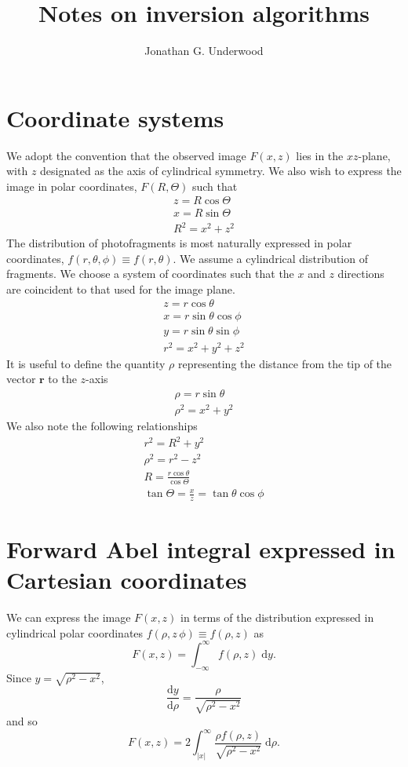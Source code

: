 \documentclass{article}
\title{Notes on inversion algorithms}
\author {Jonathan G. Underwood}
\begin{document}
\maketitle
\tableofcontents

\section{Coordinate systems}
We adopt the convention that the observed image $F(x,z)$ lies in the
$xz$-plane, with $z$ designated as the axis of cylindrical symmetry. We also
wish to express the image in polar coordinates, $F(R, \Theta)$ such that
\begin{gather}
  z=R\cos\Theta\\
  x=R\sin\Theta\\
  R^2=x^2+z^2
\end{gather}
The distribution of photofragments is most naturally expressed in polar
coordinates, $f(r, \theta, \phi)\equiv f(r, \theta)$. We assume a cylindrical
distribution of fragments. We choose a system of coordinates such that the $x$
and $z$ directions are coincident to that used for the image plane.
\begin{gather}
  z=r\cos\theta\\
  x=r\sin\theta\cos\phi\\
  y=r\sin\theta\sin\phi\\
  r^2=x^2+y^2+z^2
\end{gather}
It is useful to define the quantity $\rho$ representing the distance from the
tip of the vector $\mathbf{r}$ to the $z$-axis
\begin{gather}
  \rho=r\sin\theta\\
  \rho^2=x^2+y^2
\end{gather}
We also note the following relationships
\begin{gather}
  r^2=R^2+y^2\\
  \rho^2=r^2-z^2\\
  R=\frac{r\cos\theta}{\cos\Theta}\\
  \tan\Theta=\frac{x}{z}=\tan\theta\cos\phi
\end{gather}

\section{Forward Abel integral expressed in Cartesian coordinates}
We can express the image $F(x,z)$ in terms of the distribution expressed in
cylindrical polar coordinates $f(\rho,z\, \phi)\equiv f(\rho, z)$ as 
\begin{equation}
  F(x,z)=\int_{-\infty}^{\infty}
  f(\rho, z)\;\mathrm{d}y.
\end{equation}
Since $y=\sqrt{\rho^2-x^2}$,
\begin{equation}
  \frac{\mathrm{d}y}{\mathrm{d}\rho}
  =\frac{\rho}{\sqrt{\rho^2-x^2}}
\end{equation}
and so
\begin{equation}
  \label{eq:abel_cartesian}
  F(x,z)=2\int_{|x|}^{\infty}
  \frac{\rho f(\rho, z)}{\sqrt{\rho^2-x^2}}
  \;\mathrm{d}\rho.
\end{equation}
\end{document}
